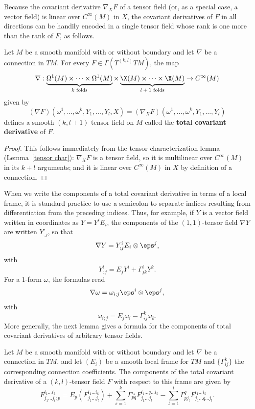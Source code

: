 Because the covariant derivative $\nabla_XF$ of a tensor field (or, as a special case, a vector 
field) is linear over $C^{\infty}(M)$ in $X$, the covariant derivatives of $F$ in all 
directions can be handily encoded in a single tensor field whose rank is one more than the 
rank of $F$, as follows.
\begin{proposition}
Let $M$ be a smooth manifold with or without boundary and let $\nabla$ be a connection in $TM$. 
For every $F\in\Gamma(T^{(k,l)}TM)$, the map
\[\nabla:\underbrace{\Omega^1(M)\times\cdots\times\Omega^1(M)}_{\text{$k$ folds}}\times\underbrace{\X(M)\times\cdots\times\X(M)}_{\text{$l+1$ folds}}\to C^{\infty}(M)\]
given by
\[(\nabla F)(\omega^1,\dots,\omega^k,Y_1,\dots,Y_l,X)=(\nabla_XF)(\omega^1,\dots,\omega^k,Y_1,\dots,Y_l)\]
defines a smooth $(k,l+1)$-tensor field on $M$ called the \textbf{total covariant derivative} of $F$.
\end{proposition}
\begin{proof}
This follows immediately from the tensor characterization lemma (Lemma~\ref{tensor char}): 
$\nabla_XF$ is a tensor field, so it is multilinear over $C^{\infty}(M)$ in its $k+l$ 
arguments; and it is linear over $C^{\infty}(M)$ in $X$ by definition of a connection.
\end{proof}
When we write the components of a total covariant derivative in terms of a local frame, 
it is standard practice to use a semicolon to separate indices resulting from differentiation 
from the preceding indices. Thus, for example, if $Y$ is a vector field written in coordinates 
as $Y=Y^iE_i$, the components of the $(1,1)$-tensor field $\nabla Y$ are written $Y^i_{;j}$, 
so that
\[\nabla Y=Y^i_{;j}E_i\otimes\eps^j,\]
with
\[Y^i_{;j}=E_jY^i+\Gamma^i_{jk}Y^k.\]
For a $1$-form $\omega$, the formulas read
\[\nabla\omega=\omega_{i;j}\eps^i\otimes\eps^j,\]
with
\[\omega_{i;j}=E_j\omega_i-\Gamma^k_{ij}\omega_k.\]
More generally, the next lemma gives a formula for the components of total covariant
derivatives of arbitrary tensor fields.
\begin{proposition}\label{connection total derivative expression}
Let $M$ be a smooth manifold with or without boundary and let $\nabla$ be a connection in $TM$, 
and let $(E_i)$ be a smooth local frame for $TM$ and $\{\Gamma_{ij}^k\}$ the corresponding 
connection coefficients. The components of the total covariant derivative of a $(k,l)$-tensor 
field $F$ with respect to this frame are given by
\[F^{i_1\dots i_k}_{j_1\dots j_l;p}=E_p(F^{i_1\dots i_k}_{j_1\dots j_l})+\sum_{s=1}^{k}\Gamma_{pq}^{i_s}F^{i_1\dots q\dots i_k}_{j_1\dots j_l}-\sum_{t=1}^{l}\Gamma_{pj_t}^qF^{i_1\dots i_k}_{j_1\dots q\dots j_l}.\]
\end{proposition}
